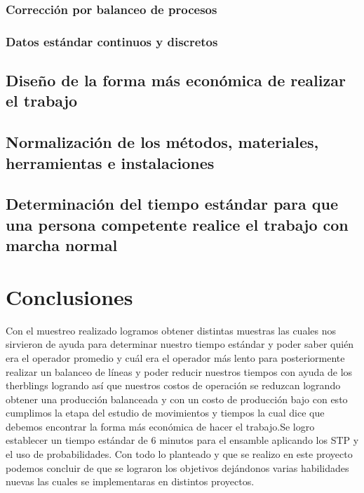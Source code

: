     \subsubsection{Corrección por balanceo de procesos}
    \subsubsection{Datos estándar continuos y discretos}
    \subsection{Diseño de la forma más económica de realizar el trabajo}
    
    \subsection{Normalización de los métodos, materiales, herramientas e instalaciones}
    
    \subsection{Determinación del tiempo estándar para que una persona competente realice el trabajo con marcha normal}
    
    
    \section{Conclusiones}
    
    Con el muestreo realizado logramos obtener distintas muestras las cuales nos sirvieron de ayuda para determinar nuestro tiempo estándar y poder saber quién era el operador promedio y cuál era el operador más lento para posteriormente realizar un balanceo de líneas y poder reducir nuestros tiempos con ayuda de los therblings logrando así que nuestros costos de operación se reduzcan logrando obtener una producción balanceada y con un costo de producción bajo con esto cumplimos la etapa del estudio de movimientos y tiempos la cual dice que debemos encontrar la forma más económica de hacer el trabajo.Se logro establecer un tiempo estándar de  6 minutos para el ensamble aplicando los STP y el uso de probabilidades. 
    Con todo lo planteado y que se realizo en este proyecto podemos concluir de que se lograron los objetivos dejándonos varias habilidades nuevas las cuales se implementaras en distintos proyectos.
    
